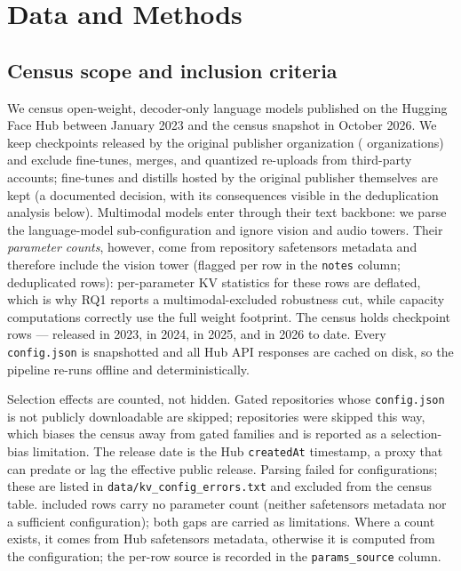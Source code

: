 \section{Data and Methods}\label{sec:data-methods}

\subsection{Census scope and inclusion criteria}\label{dm:census}
We census open-weight, decoder-only language models published on the Hugging Face Hub
between January 2023 and the census snapshot in October 2026. We keep checkpoints released
by the original publisher organization (\kvcOrgCount{} organizations) and exclude
fine-tunes, merges, and quantized re-uploads from third-party accounts; fine-tunes and
distills hosted by the original publisher themselves are kept (a documented decision,
with its consequences visible in the deduplication analysis below). Multimodal models
enter through their text backbone: we parse the language-model sub-configuration and ignore
vision and audio towers. Their \emph{parameter counts}, however, come from repository
safetensors metadata and therefore include the vision tower (flagged per row in the
\texttt{notes} column; \kvcMMRows{} deduplicated rows): per-parameter KV statistics for
these rows are deflated, which is why RQ1 reports a multimodal-excluded robustness cut,
while capacity computations correctly use the full weight footprint. The census holds \kvcCensusRows{} checkpoint rows ---
\kvcYearRowsTwentyThree{} released in 2023, \kvcYearRowsTwentyFour{} in 2024,
\kvcYearRowsTwentyFive{} in 2025, and \kvcYearRowsTwentySix{} in 2026 to date. Every
\texttt{config.json} is snapshotted and all Hub API responses are cached on disk, so the
pipeline re-runs offline and deterministically.

Selection effects are counted, not hidden. Gated repositories whose \texttt{config.json}
is not publicly downloadable are skipped; \kvcGatedSkipped{} repositories were skipped this
way, which biases the census away from gated families and is reported as a selection-bias
limitation. The release date is the Hub \texttt{createdAt} timestamp, a proxy that can
predate or lag the effective public release. Parsing failed for \kvcKvErrRows{}
configurations; these are listed in \texttt{data/kv\_config\_errors.txt} and excluded from
the census table. \kvcNoParams{} included rows carry no parameter count (neither
safetensors metadata nor a sufficient configuration); both gaps are carried as
limitations. Where a count exists, it comes from
Hub safetensors metadata, otherwise it is computed from the configuration; the per-row
source is recorded in the \texttt{params\_source} column.

